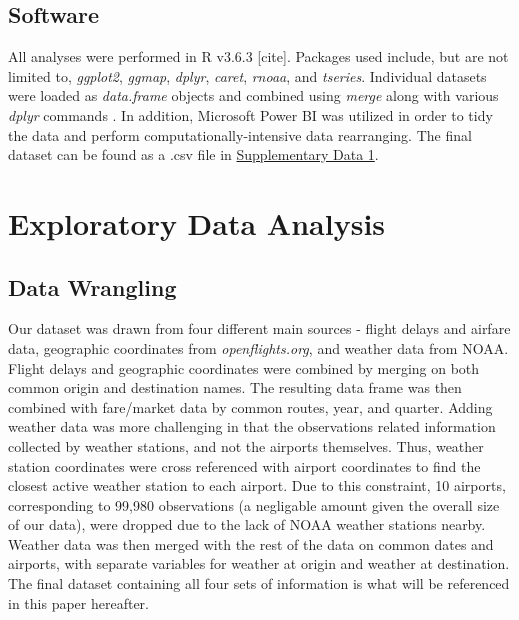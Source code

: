 \documentclass[12pt, a4paper]{book}
\newcommand\tab[1][1cm]{\hspace*{#1}}
\begin{document}
	\section{Software}
	\tab All analyses were performed in R v3.6.3 [cite]. Packages used include, but are not limited to, \textit{ggplot2}, \textit{ggmap}, \textit{dplyr}, \textit{caret}, \textit{rnoaa}, and \textit{tseries}. Individual datasets were loaded as \textit{data.frame} objects and combined using \textit{merge} along with various \textit{dplyr} commands . In addition, Microsoft Power BI was utilized in order to tidy the data and perform computationally-intensive data rearranging. The final dataset can be found as a .csv file in \underline{Supplementary Data 1}. 
	
\chapter{Exploratory Data Analysis}

	\section{Data Wrangling}
	
	\tab Our dataset was drawn from four different main sources - flight delays and airfare data, geographic coordinates from \textit{openflights.org}, and weather data from NOAA. Flight delays and geographic coordinates were combined by merging on both common origin and destination names. The resulting data frame was then combined with fare/market data by common routes, year, and quarter. Adding weather data was more challenging in that the observations related information collected by weather stations, and not the airports themselves. Thus, weather station coordinates were cross referenced with airport coordinates to find the closest active weather station to each airport. Due to this constraint, 10 airports, corresponding to 99,980 observations (a negligable amount given the overall size of our data), were dropped due to the lack of NOAA weather stations nearby. Weather data was then merged with the rest of the data on common dates and airports, with separate variables for weather at origin and weather at destination. The final dataset containing all four sets of information is what will be referenced in this paper hereafter.\\
	
\end{document}
